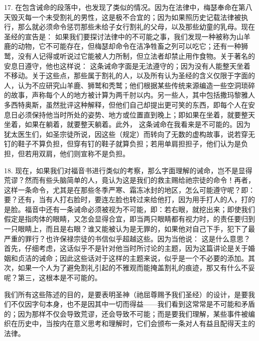 17. 在包含诫命的段落中，也发现了类似的情况。因为在法律中，梅瑟奉命在第八天毁灭每一个未受割礼的男性，这是极不合宜的；因为如果照历史记载法律被执行，那么就必须命令惩罚那些未给子女行割礼的父母，以及那些幼童的乳母。现在圣经的宣告是： 如果我们要探讨法律中的不可能之事，我们发现一种被称为山羊鹿的动物，它不可能存在，但梅瑟却命令在洁净牲畜之列可以吃它；还有一种狮鹫，没有人记得或听说过它能被人力所制，但立法者却禁止用作食物。关于著名的安息日遵守，他也这样说： 这条诫命字面是无法遵守的；因为没有人能整天坐着不移动。关于这些点，那些属于割礼的人，以及所有认为圣经的含义仅限于字面的人，认为不应研究山羊鹿、狮鹫和秃鹫；他们根据某些传统来源编造一些空洞琐碎的故事，声称每个人的地方被计算为两千肘以内。另一些人，其中包括撒玛黎雅人多西特奥斯，虽然批评这种解释，但他们自己却提出更可笑的东西，即每个人在安息日必须保持他当时所处的姿势、地方或位置直到晚上；即如果在坐着，就要整天坐着，如果在躺着，就要整天躺着。此外， 这条诫命在我看来是不可能的。因为犹太医生们，如圣宗徒所说，因这些（规定）而转向了无数的虚构故事，说若穿无钉的鞋子不算负担，但穿有钉的鞋子就算负担；若用单肩担担子，他们认为是负担，但若用双肩，他们则宣称不是负担。\par

18. 现在，如果我们对福音书进行类似的考察，那么字面理解的诫命，岂不是显得荒谬？然而有些头脑简单的人，竟认为这是我们的救主赐给祂宗徒的命令！再者，这样一条命令，尤其是在那些冬季严寒、霜冻冰封的地区，怎么可能遵守呢？即：要？还有，当有人打右脸时，要连左脸也转过来给他打，因为用手打人的人，打的是脸。福音中还有一条诫命必须被视为不可能，即：若右眼，就挖出来；即使我们假定是指肉体的眼睛，又怎会显得合宜，即当两只眼睛都有视力时，的责任要归到一只眼睛上，而且是右眼？谁又能被认为是无罪的，如果他对自己下手，犯下了最严重的罪行？也许保禄宗徒的书信似乎超越这些。因为当他说： 这是什么意思？首先，仔细考虑，这话似乎不是针对他当时所讨论的主题，因为这篇讲论是关于婚姻和贞洁的诫命；因此这些话对于这样的主题来说，似乎是一个不必要的添加。其次，如果一个人为了避免割礼引起的不雅观而能掩盖割礼的痕迹，那又有什么不妥呢？第三，这根本是不可能的。\par

我们所有这些陈述的目的，是要表明圣神（祂屈尊赐予我们圣经）的设计，是要我们不仅因字句本身，也不是因其中一切而得益——我们看到这常常是不可能和矛盾的；因为那样不仅会导致荒谬，还会导致不可能；而是要我们理解，某些事件被编织在历史中，当按内在意义思考和理解时，它们会颁布一条对人有益且配得天主的法律。\par

